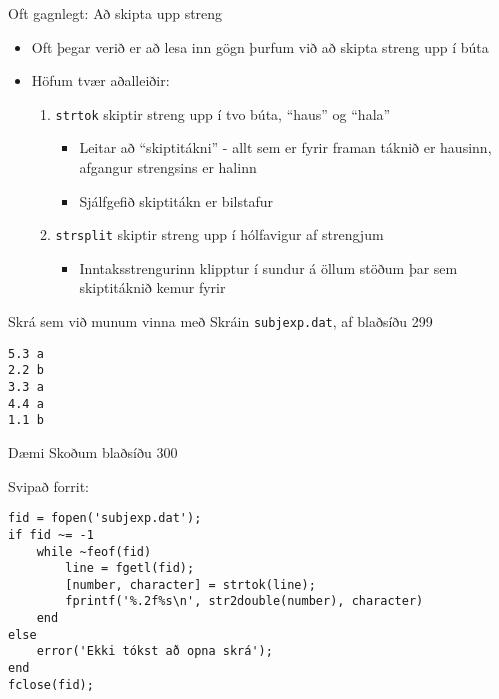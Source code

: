 \documentclass{beamer}
\begin{document}
\begin{frame}[fragile]{Oft gagnlegt: Að skipta upp streng}
\begin{itemize}
 \item Oft þegar verið er að lesa inn gögn þurfum við að skipta streng upp í búta
 \item Höfum tvær aðalleiðir: 
 \begin{enumerate}
  \item \texttt{strtok} skiptir streng upp í tvo búta, ``haus'' og ``hala''
  \begin{itemize}
   \item Leitar að ``skiptitákni'' - allt sem er fyrir framan táknið er hausinn, afgangur strengsins er halinn
   \item Sjálfgefið skiptitákn er bilstafur
  \end{itemize}
  \item \texttt{strsplit} skiptir streng upp í hólfavigur af strengjum
  \begin{itemize}
   \item Inntaksstrengurinn klipptur í sundur á öllum stöðum þar sem skiptitáknið kemur fyrir
  \end{itemize}
 \end{enumerate}
\end{itemize}
\end{frame}

\begin{frame}[fragile]{Skrá sem við munum vinna með}
Skráin \texttt{subjexp.dat}, af blaðsíðu 299
\begin{verbatim}
5.3	a
2.2	b
3.3	a
4.4	a
1.1	b
\end{verbatim}

\end{frame}


\begin{frame}[fragile]{Dæmi}
Skoðum blaðsíðu 300 \pause

Svipað forrit:
\begin{verbatim}
fid = fopen('subjexp.dat');
if fid ~= -1
    while ~feof(fid)
        line = fgetl(fid);
        [number, character] = strtok(line);
        fprintf('%.2f%s\n', str2double(number), character)
    end
else
    error('Ekki tókst að opna skrá');
end
fclose(fid);
\end{verbatim}
\end{frame}
\end{document}
